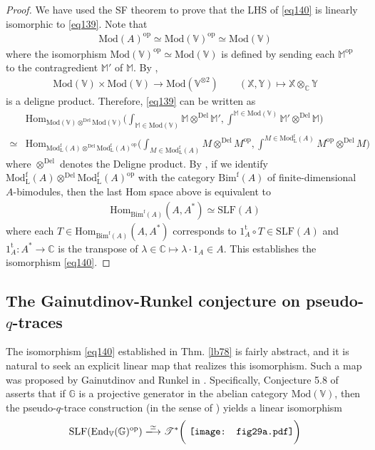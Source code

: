\documentclass[11pt,b5paper,notitlepage]{article}
\theoremstyle{definition}
\theoremstyle{plain}
\newcommand{\tr}{\mathrm{t}} %
\newcommand{\End}{\mathrm{End}} %
\newcommand{\Hom}{\mathrm{Hom}}
\newcommand{\opp}{\mathrm{op}}
\newcommand{\SLF}{\mathrm{SLF}}
\newcommand{\mbb}{\mathbb}
\newcommand{\Vbb}{\mathbb V}
\newcommand{\Xbb}{\mathbb X}
\newcommand{\Mbb}{\mathbb M}
\newcommand{\Gbb}{\mathbb G}
\newcommand{\Cbb}{\mathbb C}
\newcommand{\<}{\left\langle}
\renewcommand{\>}{\right\rangle}
\newcommand{\ST}{\mathscr{T}}
\newcommand{\Mod}{\mathrm{Mod}}
\newcommand{\ModfL}{\mathrm{Mod}^{\mathrm f}_{\mathrm L}}
\newcommand{\Del}{\mathrm{Del}}
\numberwithin{equation}{section}
\begin{document}
\begin{proof}
We have used the SF theorem to prove that the LHS of \eqref{eq140} is linearly isomorphic to \eqref{eq139}. Note that
\begin{align*}
\Mod(A)^\opp\simeq\Mod(\Vbb)^\opp\simeq\Mod(\Vbb)
\end{align*}
where the isomorphism $\Mod(\Vbb)^\opp\simeq\Mod(\Vbb)$ is defined by sending each $\Mbb^\opp$ to the contragredient $\Mbb'$ of $\Mbb$. By \cite{McR-deligne}, 
\begin{align*}
\Mod(\Vbb)\times\Mod(\Vbb)\rightarrow\Mod(\Vbb^{\otimes2})\qquad(\Xbb,\mbb Y)\mapsto\Xbb\otimes_\Cbb\mbb Y
\end{align*}
is a deligne product. Therefore, \eqref{eq139} can be written as
\begin{align*}
&\Hom_{\Mod(\Vbb)\otimes^\Del\Mod(\Vbb)}\Big(\int_{\Mbb\in\Mod(\Vbb)}\Mbb\otimes^\Del\Mbb',\int^{\Mbb\in\Mod(\Vbb)}\Mbb'\otimes^\Del\Mbb\Big)\\
\simeq&\Hom_{\ModfL(A)\otimes^\Del\ModfL(A)^\opp}\Big(\int_{M\in\ModfL(A)}M\otimes^\Del M^\opp,\int^{M\in\ModfL(A)}M^\opp\otimes^\Del M\Big)
\end{align*}
where $\otimes^\Del$ denotes the Deligne product. By \cite[Cor. 2.9]{FSS20}, if we identify $\ModfL(A)\otimes^\Del\ModfL(A)^\opp$ with the category $\mathrm{Bim}^{\mathrm f}(A)$ of finite-dimensional $A$-bimodules, then the last Hom space above is equivalent to
\begin{align*}
\Hom_{\mathrm{Bim}^{\mathrm f}(A)}(A,A^*)\simeq\SLF(A)
\end{align*}
where each $T\in \Hom_{\mathrm{Bim}^{\mathrm f}(A)}(A,A^*)$ corresponds to $1_A^\tr\circ T\in\SLF(A)$ and $1_A^\tr:A^*\rightarrow\Cbb$ is the transpose of $\lambda\in\Cbb\mapsto \lambda\cdot 1_A\in A$. This establishes the isomorphism \eqref{eq140}.
\end{proof}



\subsection{The Gainutdinov-Runkel conjecture on pseudo-$q$-traces}


The isomorphism \eqref{eq140} established in Thm. \ref{lb78} is fairly abstract, and it is natural to seek an explicit linear map that realizes this isomorphism. Such a map was proposed by Gainutdinov and Runkel in \cite{GR-Verlinde}. Specifically, Conjecture 5.8 of \cite{GR-Verlinde} asserts that if $\Gbb$ is a projective generator in the abelian category $\Mod(\Vbb)$, then the pseudo-$q$-trace construction (in the sense of \cite{AN-pseudo-trace}) yields a linear isomorphism
\begin{align}\label{eq141}
\SLF(\End_\Vbb(\Gbb)^\opp)\xlongrightarrow{\simeq}\ST^*\bigg(\vcenter{\hbox{{
		\texttt{[image: fig29a.pdf]}}}}\bigg)
\end{align}
\end{document}
